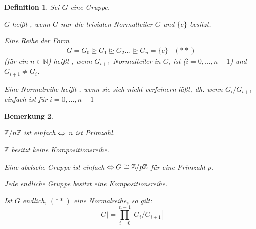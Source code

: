 \documentclass[a4paper,10pt,german]{scrbook}
\theoremstyle{saetze}
\theoremstyle{definitionen}
\newtheorem{Def}{Definition}[section]
\newtheorem{Bem}[Def]{Bemerkung}
\begin{document}
\begin{Def}
Sei $G$ eine Gruppe.
\begin{enum}
\item $G$ heißt , wenn $G$ nur die trivialen
Normalteiler $G$ und $\{e\}$ besitzt.
\item Eine Reihe der Form
\[\begin{array}{lr} G = G_0 \trianglerighteq G_1 \trianglerighteq G_2
\dots \trianglerighteq G_n = \{e\} & (\ast \ast) \end{array}\] (für ein
$n \in \mathbb{N}$) heißt , wenn $G_{i+1}$
Normalteiler in $G_i$ ist ($i=0,\dots,n-1$) und $G_{i+1} \neq G_i$.
\item Eine Normalreihe heißt , wenn sie sich
nicht verfeinern läßt, dh. wenn $G_i/G_{i+1}$ einfach ist für
$i=0,\dots,n-1$
\end{enum}
\end{Def}

\begin{Bem}
\mbox{}
\begin{enum}
\item $\mathbb{Z}/n\mathbb{Z}$ ist einfach $\Leftrightarrow$ $n$ ist Primzahl.
\item $\mathbb{Z}$ besitzt keine Kompositionsreihe.
\item Eine abelsche Gruppe ist einfach $\Leftrightarrow G \cong
\mathbb{Z}/p\mathbb{Z}$ für eine Primzahl $p$.
\item Jede endliche Gruppe besitzt eine Kompositionsreihe.
\item Ist $G$ endlich, $(\ast \ast)$ eine Normalreihe, so gilt:
\[ |G| = \prod_{i=0}^{n-1} | G_i/G_{i+1} |\]
\end{enum}
\end{Bem}
\end{document}
